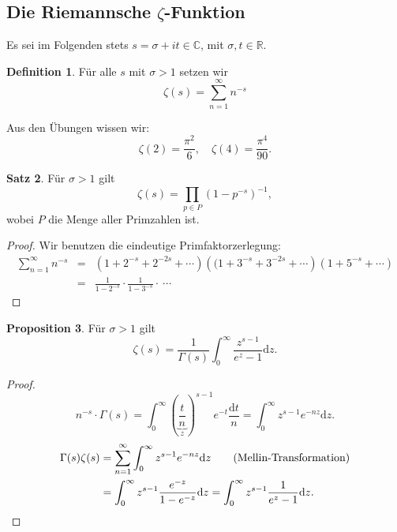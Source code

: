 \documentclass[11pt,titlepage]{article}
\theoremstyle{definition}
\newtheorem{theorem}{Satz}[section]
\newtheorem{proposition}[theorem]{Proposition}
\newtheorem{definition}[theorem]{Definition}
\theoremstyle{remark}
\begin{document}
	\subsection{Die Riemannsche $\zeta$-Funktion}
	
	Es sei im Folgenden stets $s=\sigma+it\in\mathbb{C}$, mit $\sigma,t\in\mathbb{R}$.
	
	\begin{definition}
		Für alle $s$ mit $\sigma>1$ setzen wir
		\[ \zeta(s)=\sum_{n=1}^{\infty}n^{-s} \]
	\end{definition}
	
	Aus den Übungen wissen wir:
	\[ \zeta(2)=\frac{\pi^2}{6},\quad \zeta(4)=\frac{\pi^4}{90} .\]
	
	\begin{theorem}
		Für $\sigma>1$ gilt
		\[ \zeta(s)=\prod_{p\in P} (1-p^{-s})^{-1}, \]
		wobei $P$ die Menge aller Primzahlen ist.
	\end{theorem}
	
	\begin{proof}
		Wir benutzen die eindeutige Primfaktorzerlegung:
		\begin{eqnarray*}
			\sum_{n=1}^{\infty} n^{-s} &=& \left(1+2^{-s}+2^{-2s}+\cdots\right)\left((1+3^{-s}+3^{-2s}+\cdots\right)
			\left(1+5^{-s}+\cdots\right) \\
			&=& \frac{1}{1-2^{-s}}\cdot\frac{1}{1-3^{-s}}\cdot\  \cdots
		\end{eqnarray*}
	\end{proof}
	
	\begin{proposition}\label{prop:Zeta}
		Für $\sigma>1$ gilt
		\[ \zeta(s)=\frac{1}{\Gamma(s)}\int_0^{\infty} \frac{z^{s-1}}{e^z-1}\mathrm{d}z .\]
	\end{proposition}
	
	\begin{proof}
		\[ n^{-s}\cdot \Gamma(s) =\int_0^{\infty}\left(\underbrace{\frac{t}{n}}_{z}\right)^{s-1}e^{-t}\frac{\mathrm{d}t}{n} 
		= \int_0^{\infty} z^{s-1}e^{-nz}\mathrm{d}z. \]
		\begin{align*}
			\Gamma(s)\zeta(s)&=\sum_{n=1}^{\infty}\int_0^{\infty} z^{s-1}e^{-nz}\mathrm{d}z 
			\tag{\text{Mellin-Transformation}} \\
			&= \int_0^{\infty} z^{s-1} \frac{e^{-z}}{1-e^{-z}}\mathrm{d}z 
			= \int_0^{\infty} z^{s-1} \frac{1}{e^z -1}\mathrm{d}z. \nonumber
		\end{align*}
	\end{proof}
	
\end{document}
